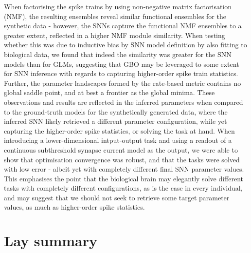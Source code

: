 \documentclass[mphil,deptreport,ianc]{infthesis} %
\begin{document}
\begin{preliminary}
{    When factorising the spike trains by using non-negative matrix factorisation (NMF), the resulting ensembles reveal similar functional ensembles for the synthetic data - however, the SNNs capture the functional NMF ensembles to a greater extent, reflected in a higher NMF module similarity.
    When testing whether this was due to inductive bias by SNN model definition by also fitting to biological data, we found that indeed the similarity was greater for the SNN models than for GLMs, suggesting that GBO may be leveraged to some extent for SNN inference with regards to capturing higher-order spike train statistics.
    Further, the parameter landscapes formed by the rate-based metric contains no global saddle point, and at best a frontier as the global minima.
    These observations and results are reflected in the inferred parameters when compared to the ground-truth models for the synthetically generated data, where the inferred SNN likely retrieved a different parameter configuration, while yet capturing the higher-order spike statistics, or solving the task at hand.
    When introducing a lower-dimensional intput-output task and using a readout of a continuous subthreshold synapse current model as the output, we were able to show that optimisation convergence was robust, and that the tasks were solved with low error - albeit yet with completely different final SNN parameter values.
    This emphasises the point that the biological brain may elegantly solve different tasks with completely different configurations, as is the case in every individual, and may suggest that we should not seek to retrieve some target parameter values, as much as higher-order spike statistics.
}


\maketitle

\section*{Lay summary}


\end{preliminary}
\end{document}
